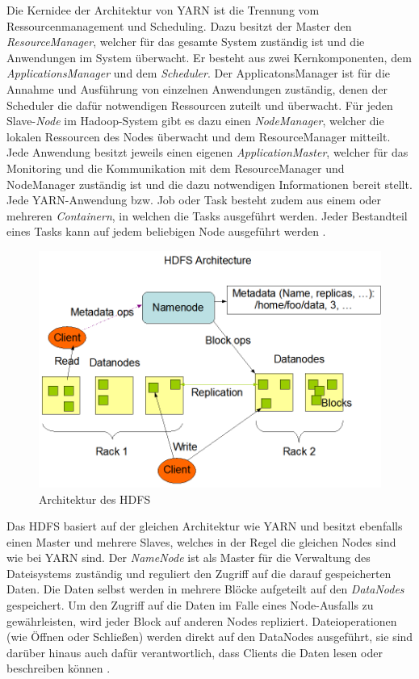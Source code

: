 Die Kernidee der Architektur von YARN ist die Trennung vom Ressourcenmanagement und Scheduling. Dazu besitzt der Master den \emph{ResourceManager}, welcher für das gesamte System zuständig ist und die Anwendungen im System überwacht. Er besteht aus zwei Kernkomponenten, dem \emph{ApplicationsManager} und dem \emph{Scheduler}. Der ApplicatonsManager ist für die Annahme und Ausführung von einzelnen Anwendungen zuständig, denen der Scheduler die dafür notwendigen Ressourcen zuteilt und überwacht. Für jeden Slave-\emph{Node} im Hadoop-System gibt es dazu einen \emph{NodeManager}, welcher die lokalen Ressourcen des Nodes überwacht und dem ResourceManager mitteilt. Jede Anwendung besitzt jeweils einen eigenen \emph{ApplicationMaster}, welcher für das Monitoring und die Kommunikation mit dem ResourceManager und NodeManager zuständig ist und die dazu notwendigen Informationen bereit stellt. Jede YARN-Anwendung bzw. Job oder Task besteht zudem aus einem oder mehreren \emph{Containern}, in welchen die Tasks ausgeführt werden. Jeder Bestandteil eines Tasks kann auf jedem beliebigen Node ausgeführt werden \cite{HadoopYarnDesc272}.

\begin{figure}
    \centering
    \includegraphics[width=\columnwidth]{./images/hdfsarchitecture.png}
    \caption[Architektur des HDFS]{Architektur des HDFS \cite{HadoopHdfsDesc272}}
    \label{fig:hdfsarch}
\end{figure}

Das HDFS basiert auf der gleichen Architektur wie YARN und besitzt ebenfalls einen Master und mehrere Slaves, welches in der Regel die gleichen Nodes sind wie bei YARN sind. Der \emph{NameNode} ist als Master für die Verwaltung des Dateisystems zuständig und reguliert den Zugriff auf die darauf gespeicherten Daten. Die Daten selbst werden in mehrere Blöcke aufgeteilt auf den \emph{DataNodes} gespeichert. Um den Zugriff auf die Daten im Falle eines Node-Ausfalls zu gewährleisten, wird jeder Block auf anderen Nodes repliziert. Dateioperationen (wie Öffnen oder Schließen) werden direkt auf den DataNodes ausgeführt, sie sind darüber hinaus auch dafür verantwortlich, dass Clients die Daten lesen oder beschreiben können \cite{HadoopHdfsDesc272}.

